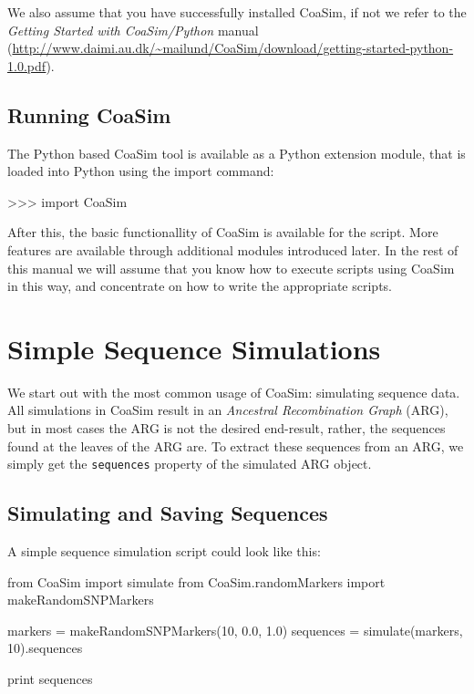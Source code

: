 \documentclass{manual}
\begin{document}
\begin{empfile}
We also assume that you have successfully installed CoaSim, if not we
refer to the \emph{Getting Started with CoaSim/Python} manual
(\url{http://www.daimi.au.dk/~mailund/CoaSim/download/getting-started-python-1.0.pdf}).


\subsection{Running CoaSim}
\label{sec:running-coasim}

The Python based CoaSim tool is available as a Python extension
module, that is loaded into Python using the import command:
\begin{code}
>>> import CoaSim
\end{code}
After this, the basic functionallity of CoaSim is available for the
script.  More features are available through additional modules
introduced later.  In the rest of this manual we will assume that you
know how to execute scripts using CoaSim in this way, and concentrate
on how to write the appropriate scripts.

\section{Simple Sequence Simulations}
\label{sec:simple-sequ-simul}

We start out with the most common usage of CoaSim: simulating sequence
data.  All simulations in CoaSim result in an \emph{Ancestral
  Recombination Graph} (ARG), but in most cases the ARG is not the
desired end-result, rather, the sequences found at the leaves of the
ARG are.  To extract these sequences from an ARG, we simply get the
\texttt{sequences} property of the simulated ARG object.

\subsection{Simulating and Saving Sequences}
\label{sec:simul-saving-sequ}


A simple sequence simulation script could look like this:
\begin{code}
from CoaSim import simulate
from CoaSim.randomMarkers import makeRandomSNPMarkers

markers = makeRandomSNPMarkers(10, 0.0, 1.0)
sequences = simulate(markers, 10).sequences

print sequences
\end{code}


\end{empfile}
\end{document}
